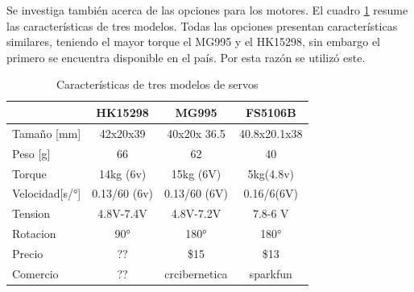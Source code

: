 \documentclass[letterpaper,journal,transmag]{IEEEtran}
\begin{document}
Se investiga también acerca de las opciones para los motores. El cuadro
\ref{tab:servos} resume las características de tres modelos. Todas las opciones
presentan características similares, teniendo el mayor torque el MG995 y el
HK15298, sin embargo el primero se encuentra disponible en el país. Por esta
razón se utilizó este.
   
      \begin{table}[ht]
      \caption{Características de tres modelos de servos}
      \centering
      \begin{tabular}{l c c c}
      \hline
            & HK15298 & MG995 &FS5106B\\
      \hline      
         
   Tamaño [mm] & 42x20x39 & 40x20x 36.5 &40.8x20.1x38 \\
   Peso [g] & 66 &62 & 40\\
   Torque & 14kg (6v) & 15kg (6V) & 5kg(4.8v)\\

   Velocidad[s/°] & 0.13/60 (6v)& 0.13/60 (6V) &0.16/6(6V) \\
   Tension & 4.8V-7.4V & 4.8V-7.2V & 7.8-6 V \\
   Rotacion & 90° &180°&180°\\
   Precio &?? &\$15 &\$13 \\
   Comercio & ?? & crcibernetica & sparkfun\\
         \hline
               \end{tabular}
      \label{tab:servos}
   \end{table}   
   
   
\end{document}
